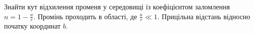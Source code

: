 \begin{problem}
Знайти кут відхилення променя у середовищі із коефіцієнтом заломлення $n = 1- \frac{a}{r}$. Промінь проходить в області, де  $\frac{a}{r} \ll 1$. Прицільна відстань відносно початку координат $b$.
\end{problem}



